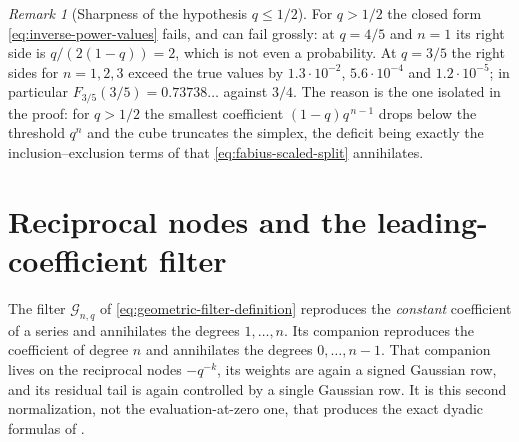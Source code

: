 \documentclass[11pt,oneside,openany]{book}
\theoremstyle{definition}
\theoremstyle{remark}
\newtheorem{remark}[remark]{Remark}
\begin{document}
\begin{remark}[Sharpness of the hypothesis $q\le1/2$]\label{rem:inverse-power-sharpness}
For $q>1/2$ the closed form \eqref{eq:inverse-power-values} fails, and can fail grossly:
at $q=4/5$ and $n=1$ its right side is $q/(2(1-q))=2$, which is not even a probability.
At $q=3/5$ the right sides for $n=1,2,3$ exceed the true values by
$1.3\cdot10^{-2}$, $5.6\cdot10^{-4}$ and $1.2\cdot10^{-5}$; in particular
$F_{3/5}(3/5)=0.73738\ldots$ against $3/4$.  The reason is the one isolated in the proof:
for $q>1/2$ the smallest coefficient $(1-q)q^{\,n-1}$ drops below the threshold $q^n$ and
the cube truncates the simplex, the deficit being exactly the inclusion--exclusion terms
of  that \eqref{eq:fabius-scaled-split} annihilates.
\end{remark}

\section{Reciprocal nodes and the leading-coefficient filter}

The filter $\mathcal G_{n,q}$ of \eqref{eq:geometric-filter-definition} reproduces the \emph{constant} coefficient of a series and annihilates the degrees $1,\ldots,n$.  Its companion reproduces the coefficient of degree $n$ and annihilates the degrees $0,\ldots,n-1$.  That companion lives on the reciprocal nodes $-q^{-k}$, its weights are again a signed Gaussian row, and its residual tail is again controlled by a single Gaussian row.  It is this second normalization, not the evaluation-at-zero one, that produces the exact dyadic formulas of .
\end{document}
